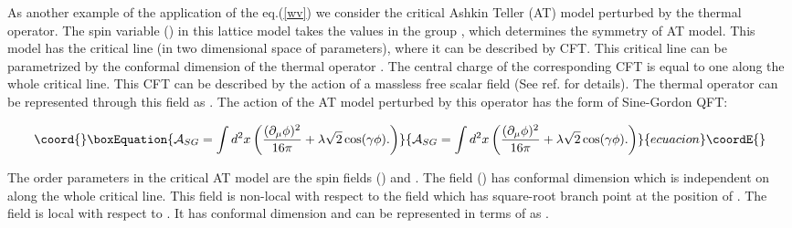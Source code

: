 \documentclass[a4paper,12pt]{article}
\begin{document}
As another example of the application of the eq.(\ref{wv}) we consider the
critical Ashkin Teller (AT) model perturbed by the thermal operator. The
spin variable \myHighlight{$\sigma $}\coordHE{} (\myHighlight{$\sigma ^{+}$}\coordHE{}) in this lattice model takes the
values in the group \coordHE{}, which determines the symmetry of AT model. This
model has the critical line (in two dimensional space of parameters), where
it can be described by CFT. This critical line can be parametrized by the
conformal dimension \coordHE{} of the thermal operator 
\myHighlight{$\varepsilon $}\coordHE{}. The central charge of the corresponding CFT is equal to one
along the whole critical line. This CFT can be described by the action of a
massless free scalar field \myHighlight{$\phi $}\coordHE{} (See ref. \cite{ZAT} for details). The
thermal operator \myHighlight{$\varepsilon $}\coordHE{} can be represented through this 
field as \coordHE{}. 
The action of the AT model
perturbed by this operator has the form of Sine-Gordon QFT:

\begin{equation}\coord{}\boxEquation{
\mathcal{A}_{SG}=\int d^2x\left( \frac{(\partial _\mu \phi )^2}{16\pi }
+\lambda \sqrt{2}\cos (\gamma \phi ).\right)   \label{asG}
}{
\mathcal{A}_{SG}=\int d^2x\left( \frac{(\partial _\mu \phi )^2}{16\pi }
+\lambda \sqrt{2}\cos (\gamma \phi ).\right)   }{ecuacion}\coordE{}\end{equation}

The order parameters in the critical AT model are the spin fields 
\myHighlight{$\sigma $}\coordHE{} (\myHighlight{$\sigma ^{+}$}\coordHE{}) and \coordHE{}. 
The field \myHighlight{$\sigma $}\coordHE{} (\myHighlight{$\sigma ^{+}$}\coordHE{}) has conformal dimension 
\coordHE{} which is independent on 
\myHighlight{$\gamma $}\coordHE{} along the whole critical line. 
This field is non-local with respect
to the field \myHighlight{$\phi $}\coordHE{} which has square-root branch point at the position of 
\myHighlight{$\sigma $}\coordHE{}. The field \myHighlight{$\Sigma $}\coordHE{} is local with respect to \myHighlight{$\phi $}\coordHE{}. It has
conformal dimension \coordHE{} and can be represented in
terms of \myHighlight{$\phi $}\coordHE{} as \coordHE{}.
\end{document}
